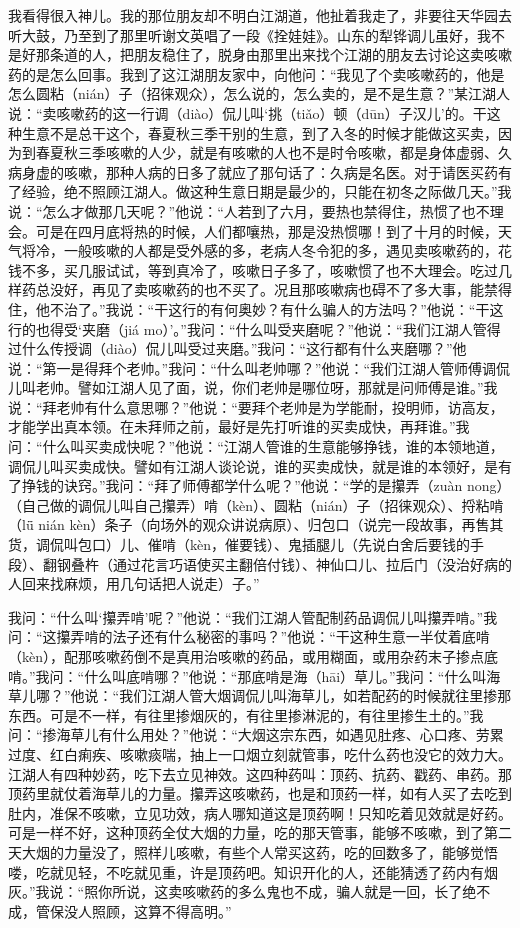 \documentclass[12pt,UTF8]{ctexbook}
\begin{document}
我看得很入神儿。我的那位朋友却不明白江湖道，他扯着我走了，非要往天华园去听大鼓，乃至到了那里听谢文英唱了一段《拴娃娃》。山东的犁铧调儿虽好，我不是好那条道的人，把朋友稳住了，脱身由那里出来找个江湖的朋友去讨论这卖咳嗽药的是怎么回事。我到了这江湖朋友家中，向他问：“我见了个卖咳嗽药的，他是怎么圆粘（nián）子（招徕观众），怎么说的，怎么卖的，是不是生意？”某江湖人说：“卖咳嗽药的这一行调（diào）侃儿叫‘挑（tiǎo）顿（dūn）子汉儿’的。干这种生意不是总干这个，春夏秋三季干别的生意，到了入冬的时候才能做这买卖，因为到春夏秋三季咳嗽的人少，就是有咳嗽的人也不是时令咳嗽，都是身体虚弱、久病身虚的咳嗽，那种人病的日多了就应了那句话了：久病是名医。对于请医买药有了经验，绝不照顾江湖人。做这种生意日期是最少的，只能在初冬之际做几天。”我说：“怎么才做那几天呢？”他说：“人若到了六月，要热也禁得住，热惯了也不理会。可是在四月底将热的时候，人们都嚷热，那是没热惯哪！到了十月的时候，天气将冷，一般咳嗽的人都是受外感的多，老病人冬令犯的多，遇见卖咳嗽药的，花钱不多，买几服试试，等到真冷了，咳嗽日子多了，咳嗽惯了也不大理会。吃过几样药总没好，再见了卖咳嗽药的也不买了。况且那咳嗽病也碍不了多大事，能禁得住，他不治了。”我说：“干这行的有何奥妙？有什么骗人的方法吗？”他说：“干这行的也得受‘夹磨（jiá mo）’。”我问：“什么叫受夹磨呢？”他说：“我们江湖人管得过什么传授调（diào）侃儿叫受过夹磨。”我问：“这行都有什么夹磨哪？”他说：“第一是得拜个老帅。”我问：“什么叫老帅哪？”他说：“我们江湖人管师傅调侃儿叫老帅。譬如江湖人见了面，说，你们老帅是哪位呀，那就是问师傅是谁。”我说：“拜老帅有什么意思哪？”他说：“要拜个老帅是为学能耐，投明师，访高友，才能学出真本领。在未拜师之前，最好是先打听谁的买卖成快，再拜谁。”我问：“什么叫买卖成快呢？”他说：“江湖人管谁的生意能够挣钱，谁的本领地道，调侃儿叫买卖成快。譬如有江湖人谈论说，谁的买卖成快，就是谁的本领好，是有了挣钱的诀窍。”我问：“拜了师傅都学什么呢？”他说：“学的是攥弄（zuàn nong）（自己做的调侃儿叫自己攥弄）啃（kèn）、圆粘（nián）子（招徕观众）、捋粘啃（lǖ nián kèn）条子（向场外的观众讲说病原）、归包口（说完一段故事，再售其货，调侃叫包口）儿、催啃（kèn，催要钱）、鬼插腿儿（先说白舍后要钱的手段）、翻钢叠杵（通过花言巧语使买主翻倍付钱）、神仙口儿、拉后门（没治好病的人回来找麻烦，用几句话把人说走）子。”

我问：“什么叫‘攥弄啃’呢？”他说：“我们江湖人管配制药品调侃儿叫攥弄啃。”我问：“这攥弄啃的法子还有什么秘密的事吗？”他说：“干这种生意一半仗着底啃（kèn），配那咳嗽药倒不是真用治咳嗽的药品，或用糊面，或用杂药末子掺点底啃。”我问：“什么叫底啃哪？”他说：“那底啃是海（hāi）草儿。”我问：“什么叫海草儿哪？”他说：“我们江湖人管大烟调侃儿叫海草儿，如若配药的时候就往里掺那东西。可是不一样，有往里掺烟灰的，有往里掺淋泥的，有往里掺生土的。”我问：“掺海草儿有什么用处？”他说：“大烟这宗东西，如遇见肚疼、心口疼、劳累过度、红白痢疾、咳嗽痰喘，抽上一口烟立刻就管事，吃什么药也没它的效力大。江湖人有四种妙药，吃下去立见神效。这四种药叫：顶药、抗药、戳药、串药。那顶药里就仗着海草儿的力量。攥弄这咳嗽药，也是和顶药一样，如有人买了去吃到肚内，准保不咳嗽，立见功效，病人哪知道这是顶药啊！只知吃着见效就是好药。可是一样不好，这种顶药全仗大烟的力量，吃的那天管事，能够不咳嗽，到了第二天大烟的力量没了，照样儿咳嗽，有些个人常买这药，吃的回数多了，能够觉悟喽，吃就见轻，不吃就见重，许是顶药吧。知识开化的人，还能猜透了药内有烟灰。”我说：“照你所说，这卖咳嗽药的多么鬼也不成，骗人就是一回，长了绝不成，管保没人照顾，这算不得高明。”
\end{document}
